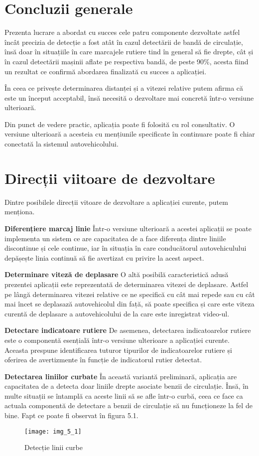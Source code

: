 \section{Concluzii generale}
Prezenta lucrare a abordat cu succes cele patru componente dezvoltate astfel încât precizia de detecție a fost atât în cazul detectării de bandă de circulație, însă doar în situațiile în care marcajele rutiere tind în general să fie drepte, cât și în cazul detectării mașinii aflate pe respectiva bandă, de peste 90\%, acesta fiind un rezultat ce confirmă abordarea finalizată cu succes a aplicației.  

În ceea ce privește determinarea distanței și a vitezei relative putem afirma că este un început acceptabil, însă necesită o dezvoltare mai concretă într-o versiune ulterioară.

Din punct de vedere practic, aplicația poate fi folosită cu rol consultativ. O versiune ulterioară a acesteia cu mențiunile specificate în continuare poate fi chiar conectată la sistemul autovehicolului.

\section{Direcții viitoare de dezvoltare}
Dintre posibilele direcții vitoare de dezvoltare a aplicației curente, putem menționa.

\textbf{Diferențiere marcaj linie}
Într-o versiune ulterioară a acestei aplicații se poate implementa un sistem ce are capacitatea de a face diferența dintre liniile discontinue și cele continue, iar în situația în care conducătorul autovehiculului depășește linia continuă să fie avertizat cu privire la acest aspect.

\textbf{Determinare viteză de deplasare}
O altă posibilă caracteristică adusă prezentei aplicații este reprezentată de determinarea vitezei de deplasare. Astfel pe lângă determinarea vitezei relative ce ne specifică cu cât mai repede sau cu cât mai încet se deplasază autovehicolul din față, să poate specifica și care este viteza curentă de deplasare a autovehicolului de la care este inregistrat video-ul.

\textbf{Detectare indicatoare rutiere}
De asemenea, detectarea indicatoarelor rutiere este o componentă esențială într-o versiune ulterioare a aplicației curente. Aceasta prespune identificarea tuturor tipurilor de indicatoarelor rutiere și oferirea de avertizmente în funcție de indicatorul rutier detectat.

\textbf{Detectarea liniilor curbate}
În această variantă preliminară, aplicația are capacitatea de a detecta doar liniile drepte asociate benzii de circulație. Însă, în multe situații se întamplă ca aceste linii să se afle într-o curbă, ceea ce face ca actuala componentă de detectare a benzii de circulație să nu funcționeze la fel de bine. Fapt ce poate fi observat în figura 5.1.

\begin{figure}[!h]
	\centering
	\texttt{[image: img\_5\_1]}
	\caption{Detecție linii curbe}
\end{figure} 